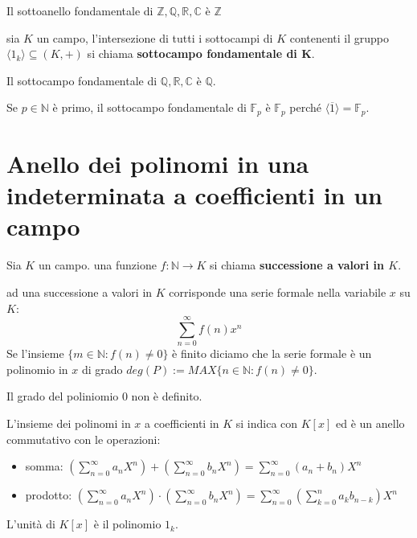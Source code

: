 \documentclass[../main.tex]{subfiles}
\begin{document}
\begin{example}
    Il sottoanello fondamentale di $\mathbb{Z},\mathbb{Q},\mathbb{R},\mathbb{C}$ è $\mathbb{Z}$
\end{example}

\begin{definition}
    sia $K$ un campo, l'intersezione di tutti i sottocampi di $K$ contenenti il gruppo $\langle1_k\rangle \subseteq (K,+)$ si chiama \textbf{sottocampo fondamentale di K}.
\end{definition}

\begin{example}
    Il sottocampo fondamentale di $\mathbb{Q},\mathbb{R},\mathbb{C}$ è $\mathbb{Q}$.

    Se $p \in \mathbb{N}$ è primo, il sottocampo fondamentale di $\mathbb{F}_p$ è $\mathbb{F}_p$ perché $\langle\overline{1}\rangle = \mathbb{F}_p$.
\end{example}

\section{Anello dei polinomi in una indeterminata a coefficienti in un campo}
\begin{definition}
    Sia $K$ un campo. una funzione $f: \mathbb{N} \rightarrow K$ si chiama \textbf{successione a valori in $K$}.
\end{definition}
ad una successione a valori in $K$ corrisponde una serie formale nella variabile $x$ su $K$:
\begin{equation*}
    \sum_{n=0}^{\infty} f(n) x^n
\end{equation*}
Se l'insieme $\{ m \in \mathbb{N} : f(n) \neq 0\}$ è finito diciamo che la serie formale è un polinomio in $x$ di grado $deg(P) := MAX \{ n \in \mathbb{N}: f(n) \neq 0\}$.

Il grado del poliniomio 0 non è definito.

L'insieme dei polinomi in $x$ a coefficienti in $K$ si indica con $K[x]$ ed è un anello commutativo con le operazioni:
\begin{itemize}
    \item somma: $(\sum_{n=0}^{\infty} a_n X^n) + (\sum_{n=0}^{\infty} b_n X^n) = \sum_{n=0}^{\infty} (a_n + b_n) X^n$
    \item prodotto: $(\sum_{n=0}^{\infty} a_n X^n) \cdot (\sum_{n=0}^{\infty} b_n X^n) = \sum_{n=0}^{\infty} (\sum_{k=0}^{n} a_k b_{n-k}) X^n$
\end{itemize}
L'unità di $K[x]$ è il polinomio $1_k$.
\end{document}
